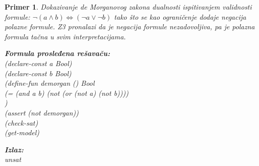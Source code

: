 \documentclass[12pt,oneside]{memoir}
\newcommand\tab[1][0.5cm]{\hspace*{#1}}
\newtheorem{primer}{Primer}
\begin{document}
\begin{primer} Dokazivanje de Morganovog zakona dualnosti ispitivanjem validnosti formule: $\neg{(a \land b)} \Leftrightarrow (\neg{a} \lor \neg{b}) $ tako što se kao ograničenje dodaje negacija polazne formule. Z3 pronalazi da je negacija formule nezadovoljiva, pa je polazna formula tačna u svim interpretacijama. \\

\hspace{-0.6cm}
\begin{minipage}[b]{0.5\textwidth}
\textbf{Formula prosleđena rešavaču:}
\\(declare-const a Bool)
\\(declare-const b Bool)
\\(define-fun demorgan () Bool
\\\tab (= (and a b) (not (or (not a) (not b))))
\\)
\\(assert (not demorgan))
\\(check-sat) 
\\(get-model)
\end{minipage}
\hspace{1.5cm}
\begin{minipage}[t]{0.4\textwidth}
\vspace{-5.35cm}
\textbf{Izlaz:}
\\unsat
\end{minipage}
\end{primer}
 
\end{document}
